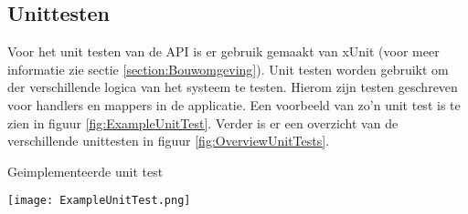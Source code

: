\subsection{Unittesten}
Voor het unit testen van de API is er gebruik gemaakt van xUnit (voor meer informatie zie sectie \ref{section:Bouwomgeving}).
Unit testen worden gebruikt om der verschillende logica van het systeem te testen.
Hierom zijn testen geschreven voor handlers en mappers in de applicatie.
Een voorbeeld van zo'n unit test is te zien in figuur \ref{fig:ExampleUnitTest}.
Verder is er een overzicht van de verschillende unittesten in figuur \ref{fig:OverviewUnitTests}.

\whitespace[2]
\begin{graphic}
	\captionsetup{type=figure}
	\caption{Geimplementeerde unit test}
	\texttt{[image: ExampleUnitTest.png]}
	\label{fig:ExampleUnitTest}
\end{graphic}
